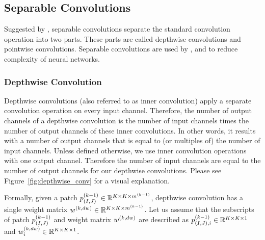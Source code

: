 \subsection{Separable Convolutions}
Suggested by \cite{sifre2014rigid}, separable convolutions separate the standard convolution operation into two parts. These parts are called depthwise convolutions and pointwise convolutions. Separable convolutions are used by \cite{chollet2016xception}, \cite{howard2017mobilenets} and \cite{howard2017mobilenets} to reduce complexity of neural networks.
\subsubsection{Depthwise Convolution}
Depthwise convolutions (also referred to as inner convolution) apply a separate convolution operation  on every input channel. Therefore, the number of output channels of a depthwise convolution is the number of input channels times the number of output channels of these inner convolutions. In other words, it results with a number of output channels that is equal to (or multiples of) the number of input channels. Unless defined otherwise, we use inner convolution operations with one output channel. Therefore the number of input channels are equal to the number of output channels for our depthwise convolutions. Please see Figure~\ref{fig:depthwise_conv} for a visual explanation.

Formally, given a patch $ p^{(k-1)}_{(I,J)} \in \mathbb{R}^{K \times K \times m^{(k-1)}}$, depthwise convolution has a single weight matrix $w^{(k, dw)} \in \mathbb{R}^{K \times K \times m^{(k-1)}}$. Let us assume that the subscripts of patch $p^{(k-1)}_{(I,J)}$ and weight matrix $w^{(k, dw)}$ are described as $p^{(k-1)}_{(I,J),i} \in \mathbb{R}^{K \times K \times 1}$ and $w^{(k, dw)}_{i} \in \mathbb{R}^{K \times K \times 1}$.

